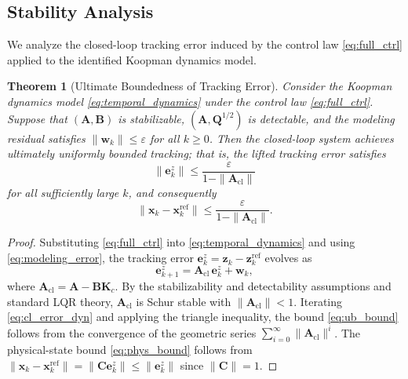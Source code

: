 \documentclass[journal]{IEEEtran}
\newtheorem{theorem}{Theorem}
\newcommand{\vx}{\mathbf{x}}
\newcommand{\vz}{\mathbf{z}}
\newcommand{\vw}{\mathbf{w}}
\newcommand{\ve}{\mathbf{e}}
\newcommand{\mA}{\mathbf{A}}
\newcommand{\mB}{\mathbf{B}}
\newcommand{\mC}{\mathbf{C}}
\newcommand{\mQ}{\mathbf{Q}}
\newcommand{\mK}{\mathbf{K}}
\begin{document}
\subsection{Stability Analysis}
\label{subsec:stability}

We analyze the closed-loop tracking error induced by the control law \eqref{eq:full_ctrl} applied to the identified Koopman dynamics model.

\begin{theorem}[Ultimate Boundedness of Tracking Error]
\label{thm:ub}
Consider the Koopman  dynamics model \eqref{eq:temporal_dynamics} under the control law \eqref{eq:full_ctrl}. Suppose that $(\mA, \mB)$ is stabilizable, $(\mA, \mQ^{1/2})$ is detectable, and the modeling residual satisfies $\|\vw_k\| \leq \varepsilon$ for all $k \geq 0$. Then the closed-loop system achieves ultimately uniformly bounded tracking; that is, the lifted tracking error satisfies
\begin{equation}
    \|\ve_k^z\| \leq \frac{\varepsilon}{1 - \|\mA_{\mathrm{cl}}\|}
    \label{eq:ub_bound}
\end{equation}
for all sufficiently large $k$, and consequently
\begin{equation}
    \|\vx_k - \vx_k^{\mathrm{ref}}\| \leq \frac{\varepsilon}{1 - \|\mA_{\mathrm{cl}}\|}.
    \label{eq:phys_bound}
\end{equation}
\end{theorem}

\begin{proof}
Substituting \eqref{eq:full_ctrl} into \eqref{eq:temporal_dynamics} and using \eqref{eq:modeling_error}, the tracking error $\ve_k^z = \vz_k - \vz_k^{\mathrm{ref}}$ evolves as
\begin{equation}
    \ve_{k+1}^z = \mA_{\mathrm{cl}}\, \ve_k^z + \vw_k,
    \label{eq:cl_error_dyn}
\end{equation}
where $\mA_{\mathrm{cl}} = \mA - \mB\mK_c$. By the stabilizability and detectability assumptions and standard LQR theory, $\mA_{\mathrm{cl}}$ is Schur stable with $\|\mA_{\mathrm{cl}}\| < 1$. Iterating \eqref{eq:cl_error_dyn} and applying the triangle inequality, the bound \eqref{eq:ub_bound} follows from the convergence of the geometric series $\sum_{i=0}^{\infty}\|\mA_{\mathrm{cl}}\|^i$. The physical-state bound \eqref{eq:phys_bound} follows from $\|\vx_k - \vx_k^{\mathrm{ref}}\| = \|\mC\ve_k^z\| \leq \|\ve_k^z\|$ since $\|\mC\| = 1$.
\end{proof}
\end{document}
